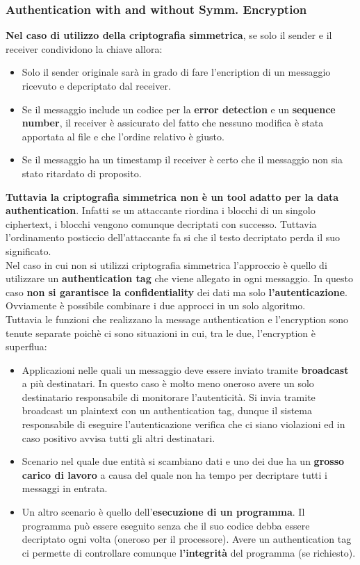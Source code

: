 \documentclass[12pt]{article}
\begin{document}
		\subsubsection{Authentication with and without Symm. Encryption}
			\textbf{Nel caso di utilizzo della criptografia simmetrica}, se solo il sender e il receiver condividono la chiave allora:
			\begin{itemize}
				\item Solo il sender originale sarà in grado di fare l'encription di un messaggio ricevuto e depcriptato dal receiver.
				\item Se il messaggio include un codice per la \textbf{error detection} e un \textbf{sequence number}, il receiver è assicurato del fatto che nessuno modifica è stata apportata al file e che l'ordine relativo è giusto.
				\item Se il messaggio ha un timestamp il receiver è certo che il messaggio non sia stato ritardato di proposito.
			\end{itemize}
		\textbf{Tuttavia la criptografia simmetrica non è un tool adatto per la data authentication}. Infatti se un attaccante riordina i blocchi di un singolo ciphertext, i blocchi vengono comunque decriptati con successo. Tuttavia l'ordinamento posticcio dell'attaccante fa si che il testo decriptato perda il suo significato.   \\
		Nel caso in cui non si utilizzi criptografia simmetrica l'approccio è quello di utilizzare un \textbf{authentication tag} che viene allegato in ogni messaggio. In questo caso \textbf{non si garantisce la confidentiality} dei dati ma solo \textbf{l'autenticazione}. Ovviamente è possibile combinare i due approcci in un solo algoritmo.\\
		Tuttavia le funzioni che realizzano la message authentication e l'encryption sono tenute separate poichè ci sono situazioni in cui, tra le due, l'encryption è superflua:
		\begin{itemize}
			\item Applicazioni nelle quali un messaggio deve essere inviato tramite \textbf{broadcast} a più destinatari. In questo caso è molto meno oneroso avere un solo destinatario responsabile di monitorare l'autenticità. Si invia tramite broadcast un plaintext con un authentication tag, dunque il sistema responsabile di eseguire l'autenticazione verifica che ci siano violazioni ed in caso positivo avvisa tutti gli altri destinatari.
			\item Scenario nel quale due entità si scambiano dati e uno dei due ha un \textbf{grosso carico di lavoro} a causa del quale non ha tempo per 	decriptare tutti i messaggi in entrata.
			\item Un altro scenario è quello dell'\textbf{esecuzione di un programma}. Il programma può essere eseguito senza che il suo codice debba essere decriptato ogni volta (oneroso per il processore). Avere un authentication tag ci permette di controllare comunque \textbf{l'integrità} del programma (se richiesto). 
		\end{itemize}
\end{document}
